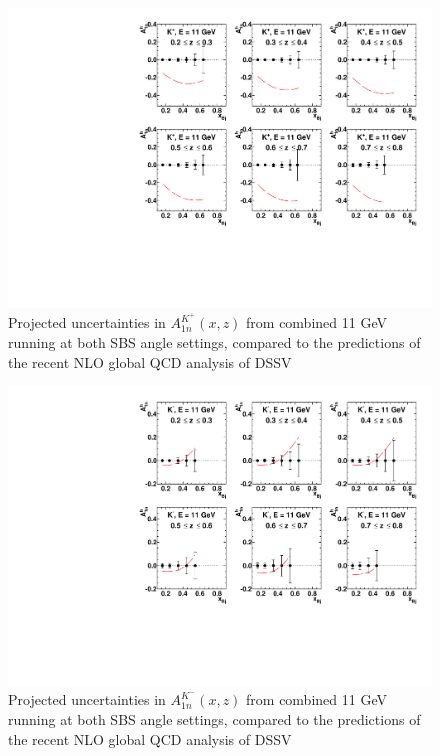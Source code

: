 \begin{figure}[h]
  \begin{center}
    \includegraphics[width=.75\textwidth]{figures/A1n_vs_x_E11_kp.pdf}
  \end{center}
  \caption{\label{A1n_kp_11gev} Projected uncertainties in $A_{1n}^{K^+}(x,z)$ from combined 11 GeV running at both SBS angle settings, compared to the predictions of the recent NLO global QCD analysis of DSSV~\cite{DSSVplus}}
\end{figure}

\begin{figure}[h]
  \begin{center}
    \includegraphics[width=.75\textwidth]{figures/A1n_vs_x_E11_km.pdf}
  \end{center}
  \caption{\label{A1n_km_11gev} Projected uncertainties in $A_{1n}^{K^-}(x,z)$ from combined 11 GeV running at both SBS angle settings, compared to the predictions of the recent NLO global QCD analysis of DSSV~\cite{DSSVplus}}
\end{figure}


